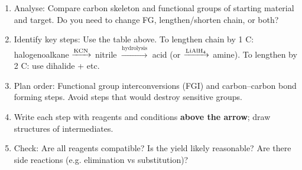 \documentclass[11pt]{article}
\newcommand{\cle}[1]{{\popxbold\color{popdark}#1}}
\begin{document}
\begin{methode}
\begin{enumerate}
\item \cle{Analyse}: Compare carbon skeleton and functional groups of starting material and target. Do you need to change FG, lengthen/shorten chain, or both?
\item \cle{Identify key steps}: Use the table above. To lengthen chain by 1 C: halogenoalkane $\xrightarrow{\ce{KCN}}$ nitrile $\xrightarrow{\text{hydrolysis}}$ acid (or $\xrightarrow{\ce{LiAlH4}}$ amine). To lengthen by 2 C: use dihalide +  etc.
\item \cle{Plan order}: Functional group interconversions (FGI) and carbon–carbon bond forming steps. Avoid steps that would destroy sensitive groups.
\item \cle{Write each step} with reagents and conditions \textbf{above the arrow}; draw structures of intermediates.
\item \cle{Check}: Are all reagents compatible? Is the yield likely reasonable? Are there side reactions (e.g. elimination vs substitution)?
\end{enumerate}
\end{methode}
\end{document}
